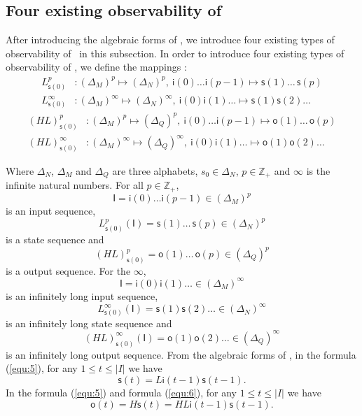 \subsection{Four existing observability of \BCNs}
After introducing the algebraic forms of \BCNs, we introduce four existing types of observability of \BCNs\ in this subsection. In order to introduce four existing types of observability of \BCNs, we define the mappings \cite{Zhang2016Observability}:
\begin{equation}
\begin{split}
L^p_{\mathsf{s}(0)} &: (\Delta_M)^p\mapsto(\Delta_N)^p,\ \mathsf{i}(0)\ldots \mathsf{i}({p-1}) \mapsto \mathsf{s}(1) \ldots\, \mathsf{s}(p)\\
L^{\infty}_{\mathsf{s}(0)} &: (\Delta_M)^{\infty}\mapsto(\Delta_N)^{\infty},\ \mathsf{i}(0) \mathsf{i}(1) \ldots  \mapsto \mathsf{s}(1) \mathsf{s}(2) \ldots
\end{split}
\label{equ:5}
\end{equation}
\begin{equation}
\begin{split}
(HL)^p_{\mathsf{s}(0)} &: (\Delta_M)^p\mapsto(\Delta_Q)^p,\ \mathsf{i}(0)\ldots \mathsf{i}(p-1) \mapsto \mathsf{o}(1)\ldots\, \mathsf{o}(p)\\
(HL)^{\infty}_{\mathsf{s}(0)} &: (\Delta_M)^{\infty}\mapsto(\Delta_Q)^{\infty},\ \mathsf{i}(0) \mathsf{i}(1) \ldots  \mapsto \mathsf{o}(1) \mathsf{o}(2)\ldots
\end{split}
\label{equ:6}
\end{equation}

Where $\Delta_N$, $\Delta_M$ and $\Delta_Q$ are three alphabets, $s_0\in \Delta_N$, $p\in \mathbb{Z}_+$ and $\infty$ is the infinite natural numbers. For all  $p\in \mathbb{Z}_+$, 
\[\mathsf{I}=\mathsf{i}(0)\ldots \mathsf{i}({p-1}) \in(\Delta_M)^p\] 
is an input sequence, 
\[L^p_{\mathsf{s}(0)}(\mathsf{I})=\mathsf{s}(1) \ldots\, \mathsf{s}(p) \in(\Delta_N)^p\]
 is a state sequence and 
 \[(HL)^p_{\mathsf{s}(0)}=\mathsf{o}(1)\ldots\, \mathsf{o}(p) \in(\Delta_Q)^p\] 
 is a output sequence. For the $\infty$, 
 \[\mathsf{I}=\mathsf{i}(0) \mathsf{i}(1)\ldots  \in(\Delta_M)^{\infty}\] 
 is an infinitely long input sequence, 
 \[L^{\infty}_{\mathsf{s}(0)}(\mathsf{I})=\mathsf{s}(1) \mathsf{s}(2)\ldots  \in(\Delta_N)^{\infty}\] 
 is an infinitely long state sequence and 
 \[(HL)^{\infty}_{\mathsf{s}(0)}(\mathsf{I})=\mathsf{o}(1) \mathsf{o}(2)\ldots \in(\Delta_Q)^{\infty}\]
  is an infinitely long output sequence. From the algebraic forms of \BCNs, in the formula (\ref{equ:5}), for any $1\le t \le |I|$ we have 
 \[\mathsf{s}(t)=L\mathsf{i}({t-1})\mathsf{s}({t-1}).\] 
 In the formula (\ref{equ:5}) and formula (\ref{equ:6}), for any $1\le t \le |I|$ we have  
 \[\mathsf{o}(t)=H\mathsf{s}(t)=HL\mathsf{i}({t-1})\mathsf{s}({t-1}).\] 

